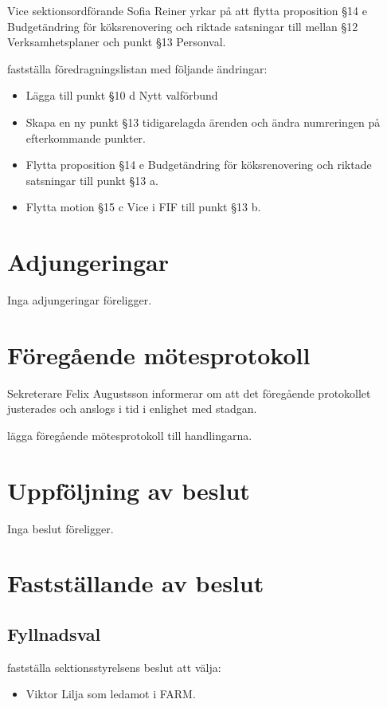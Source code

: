 \documentclass[hidelinks]{sektionsmote}
\begin{document}
Vice sektionsordförande Sofia Reiner yrkar på att flytta proposition §14 e Budgetändring för köksrenovering och riktade satsningar till mellan §12 Verksamhetsplaner och punkt §13 Personval.
\begin{beslut}
  \item fastställa föredragningslistan med följande ändringar:
  \begin{itemize}
    \item Lägga till punkt §10 d Nytt valförbund
    \item Skapa en ny punkt §13 tidigarelagda ärenden och ändra numreringen på efterkommande punkter.
    \item Flytta proposition §14 e Budgetändring för köksrenovering och riktade satsningar till punkt §13 a.
    \item Flytta motion §15 c Vice i FIF till punkt §13 b.
  \end{itemize}
\end{beslut} %


\section{Adjungeringar}
Inga adjungeringar föreligger.


\section{Föregående mötesprotokoll}
Sekreterare Felix Augustsson informerar om att det föregående protokollet justerades och anslogs i tid i enlighet med stadgan.
\begin{beslut}
    \item lägga föregående mötesprotokoll till handlingarna. 
\end{beslut}


\section{Uppföljning av beslut}
Inga beslut föreligger.


\section{Fastställande av beslut}
\subsection{Fyllnadsval}
\begin{beslut}
  \item fastställa sektionsstyrelsens beslut att välja:
  \begin{itemize}
      \item Viktor Lilja som ledamot i FARM.
  \end{itemize}
\end{beslut}
\end{document}
